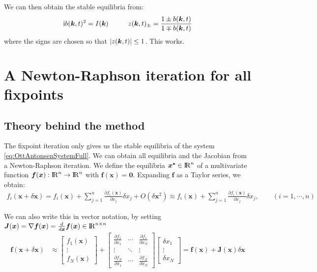 We can then obtain the stable equilibria from:
\begin{align}
\ic b(\k,t)^2 = I(\k) \hspace{10mm} z(\k, t)_{\pm} = \frac{1 \pm b(\k,t)}{1 \mp b(\k,t)} \label{eq:fixedpointiterations} 
\end{align}
where the signs are chosen so that $\vert z({\boldsymbol{k}}, t) \vert \leq 1$. This works.


\section{A Newton-Raphson iteration for all fixpoints}
\subsection{Theory behind the method}
The fixpoint iteration only gives us the stable equilibria of the system \eqref{eq:OttAntonsenSystemFull}. We can obtain all equilibria and the Jacobian from a Newton-Raphson iteration. We define the equilibria $\boldsymbol{x^\ast} \in {\rm I\!R}^n$ of a multivariate function $\boldsymbol{f}(\boldsymbol{x}) : {\rm I\!R}^n \rightarrow {\rm I\!R}^n$ with $\boldsymbol{f}(\boldsymbol{x}) = \boldsymbol{0}$. Expanding $\boldsymbol{f}$ as a Taylor series, we obtain:
\begin{align}
f_i(\boldsymbol{x} + \delta \boldsymbol{x}) =f_{i}(\boldsymbol{x}) + \sum_{j=1}^{n} \frac{\partial f_{i}(\boldsymbol{x})}{\partial x_{j}} \delta x_{j}+O\left(\delta \boldsymbol{x}^{2}\right) \approx f_{i}(\boldsymbol{x})+\sum_{j=1}^{n} \frac{\partial f_{i}(\boldsymbol{x})}{\partial x_{j}} \delta x_{j}, \qquad (i=1, \cdots, n)
\end{align}

We can also write this in vector notation, by setting $\boldsymbol{J}(\boldsymbol{x}) = \nabla \boldsymbol{f}(\boldsymbol{x}) = \frac{d}{d\boldsymbol{x}} \boldsymbol{f}(\boldsymbol{x}) \in {\rm I\!R}^{n \times n}$ 
\begin{align}
\boldsymbol{f}(\boldsymbol{x}+\delta \boldsymbol{x}) &\approx\left[\begin{array}{c}f_{1}(\boldsymbol{x}) \\ \vdots \\ f_{N}(\boldsymbol{x})\end{array}\right] 
+ \left[\begin{array}{ccc}\frac{\partial f_{1}}{\partial x_{1}} & \cdots & \frac{\partial f_{1}}{\partial x_{N}} \\ \vdots & \ddots & \vdots \\ \frac{\partial f_{N}}{\partial x_{1}} & \cdots & \frac{\partial f_{N}}{\partial x_{N}}\end{array}\right]
\left[\begin{array}{c}\delta x_{1} \\ \vdots \\ \delta x_{N}\end{array}\right] 
=\boldsymbol{f}(\boldsymbol{x})+\boldsymbol{J}(\boldsymbol{x}) \delta \boldsymbol{x} 
\end{align}

